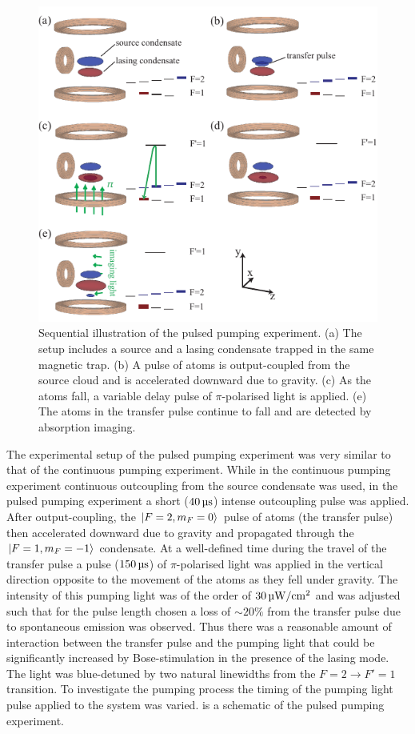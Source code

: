 \begin{figure}
    \centering
    \includegraphics[width=12cm]{PulsedPumpingScheme}
    \caption{Sequential illustration of the pulsed pumping experiment. (a) The setup includes a source and a lasing condensate trapped in the same magnetic trap. (b) A pulse of atoms is output-coupled from the source cloud and is accelerated downward due to gravity. (c) As the atoms fall, a variable delay pulse of $\pi$-polarised light is applied. (e) The atoms in the transfer pulse continue to fall and are detected by absorption imaging.}
    \label{OpticalPumping:PulsedPumpingScheme}
\end{figure}


The experimental setup of the pulsed pumping experiment was very similar to that of the continuous pumping experiment.  While in the continuous pumping experiment continuous outcoupling from the source condensate was used, in the pulsed pumping experiment a short ($\unit[40]{\micro s}$) intense outcoupling pulse was applied.  After output-coupling, the ${\left|F=2, m_F=0\right>}$ pulse of atoms (the transfer pulse) then accelerated downward due to gravity and propagated through the ${\left|F=1, m_F=-1\right>}$ condensate.  At a well-defined time during the travel of the transfer pulse a pulse ($\unit[150]{\micro s}$) of $\pi$-polarised light was applied in the vertical direction opposite to the movement of the atoms as they fell under gravity.  The intensity of this pumping light was of the order of $\unit[30]{\micro W/cm\textsuperscript{2}}$ and was adjusted such that for the pulse length chosen a loss of $\sim 20\%$ from the transfer pulse due to spontaneous emission was observed.  Thus there was a reasonable amount of interaction between the transfer pulse and the pumping light that could be significantly increased by Bose-stimulation in the presence of the lasing mode.  The light was blue-detuned by two natural linewidths from the $F=2 \rightarrow F'=1$ transition.  To investigate the pumping process the timing of the pumping light pulse applied to the system was varied.   is a schematic of the pulsed pumping experiment.

